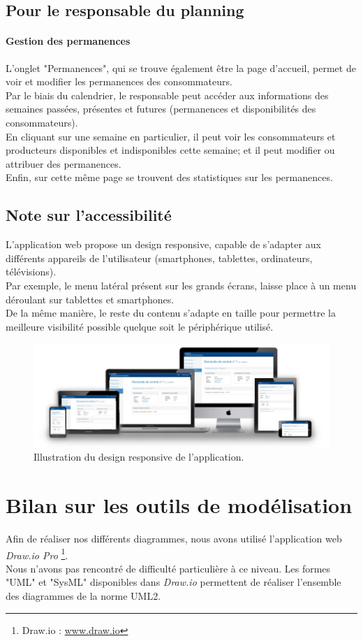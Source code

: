 \documentclass[12pt]{report}
\begin{document}
\subsection{Pour le responsable du planning}
\paragraph{Gestion des permanences}
L'onglet "Permanences", qui se trouve également être la page d'accueil, permet de voir et modifier les permanences des consommateurs.\\
Par le biais du calendrier, le responsable peut accéder aux informations des semaines passées, présentes et futures (permanences et disponibilités des consommateurs).\\
En cliquant sur une semaine en particulier, il peut voir les consommateurs et producteurs disponibles et indisponibles cette semaine; et il peut modifier ou attribuer des permanences.\\

Enfin, sur cette même page se trouvent des statistiques sur les permanences.

\subsection{Note sur l'accessibilité}
L'application web propose un design responsive, capable de s'adapter aux différents appareils de l'utilisateur (smartphones, tablettes, ordinateurs, télévisions).\\
Par exemple, le menu latéral présent sur les grands écrans, laisse place à un menu déroulant sur tablettes et smartphones.\\
De la même manière, le reste du contenu s'adapte en taille pour permettre la meilleure visibilité possible quelque soit le périphérique utilisé.

\begin{figure}[h]
\centering
\includegraphics[width=1.\textwidth]{./ressources/responsive_design.png}
\caption{Illustration du design responsive de l'application.}
\end{figure}

\clearpage
\section{Bilan sur les outils de modélisation}
Afin de réaliser nos différents diagrammes, nous avons utilisé l'application web \textit{Draw.io Pro} \footnote{Draw.io : \url{www.draw.io}}.\\
Nous n'avons pas rencontré de difficulté particulière à ce niveau. Les formes "UML" et "SysML" disponibles dans \textit{Draw.io} permettent de réaliser l'ensemble des diagrammes de la norme UML2.
\end{document}
